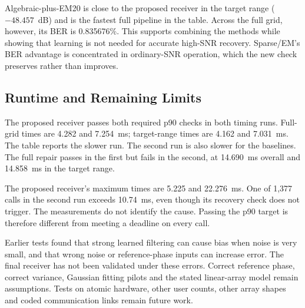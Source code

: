 Algebraic-plus-EM20 is close to the proposed receiver in the target range ($-48.457$~dB) and is the fastest full pipeline in the table. Across the full grid, however, its BER is 0.835676\%. This supports combining the methods while showing that learning is not needed for accurate high-SNR recovery. Sparse/EM's BER advantage is concentrated in ordinary-SNR operation, which the new check preserves rather than improves.

\subsection{Runtime and Remaining Limits}
The proposed receiver passes both required p90 checks in both timing runs. Full-grid times are 4.282 and 7.254~ms; target-range times are 4.162 and 7.031~ms. The table reports the slower run. The second run is also slower for the baselines. The full repair passes in the first but fails in the second, at 14.690~ms overall and 14.858~ms in the target range.

The proposed receiver's maximum times are 5.225 and 22.276~ms. One of 1,377 calls in the second run exceeds 10.74~ms, even though its recovery check does not trigger. The measurements do not identify the cause. Passing the p90 target is therefore different from meeting a deadline on every call.

Earlier tests found that strong learned filtering can cause bias when noise is very small, and that wrong noise or reference-phase inputs can increase error. The final receiver has not been validated under these errors. Correct reference phase, correct variance, Gaussian fitting pilots and the stated linear-array model remain assumptions. Tests on atomic hardware, other user counts, other array shapes and coded communication links remain future work.
